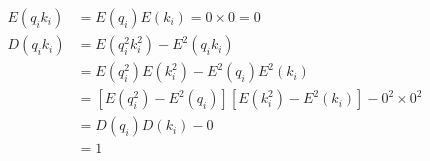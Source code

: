 \begin{align*}
E(q_ik_i) &= E(q_i)E(k_i) = 0 \times 0 = 0 \\
D(q_ik_i) &= E(q_i^2k_i^2) - E^2(q_ik_i) \\
&= E(q_i^2)E(k_i^2) - E^2(q_i)E^2(k_i) \\
&= \left [E(q_i^2) - E^2(q_i) \right ] \left [E(k_i^2) - E^2(k_i) \right ] - 0^2 \times 0^2 \\
&= D(q_i)D(k_i) - 0 \\
&= 1
\end{align*}